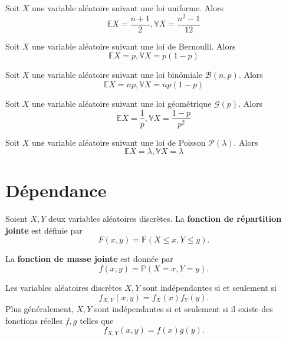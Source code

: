 \documentclass[]{book}
\theoremstyle{definition}
\theoremstyle{definition}
\theoremstyle{definition}
\theoremstyle{remark}
\let\BeginKnitrBlock\begin \let\EndKnitrBlock\end
\begin{document}
\BeginKnitrBlock{theorem}
\protect\hypertarget{thm:unnamed-chunk-18}{}{\label{thm:unnamed-chunk-18} }Soit \(X\) une variable aléatoire suivant une loi uniforme. Alors
\[\mathbb{E}X = \frac{n+1}{2} , \mathbb{V}X = \frac{n^2-1}{12}\]
\EndKnitrBlock{theorem}

\BeginKnitrBlock{theorem}
\protect\hypertarget{thm:unnamed-chunk-19}{}{\label{thm:unnamed-chunk-19} }Soit \(X\) une variable aléatoire suivant une loi de Bernoulli. Alors
\[\mathbb{E}X = p , \mathbb{V}X = p(1-p)\]
\EndKnitrBlock{theorem}

\BeginKnitrBlock{theorem}
\protect\hypertarget{thm:unnamed-chunk-20}{}{\label{thm:unnamed-chunk-20} }Soit \(X\) une variable aléatoire suivant une loi binômiale \(\mathcal{B}(n,p)\). Alors
\[\mathbb{E}X = np , \mathbb{V}X = np(1-p)\]
\EndKnitrBlock{theorem}

\BeginKnitrBlock{theorem}
\protect\hypertarget{thm:unnamed-chunk-21}{}{\label{thm:unnamed-chunk-21} }Soit \(X\) une variable aléatoire suivant une loi géométrique \(\mathcal{G}(p)\). Alors
\[\mathbb{E}X = \frac{1}{p} , \mathbb{V}X = \frac{1-p}{p^2}\]
\EndKnitrBlock{theorem}

\BeginKnitrBlock{theorem}
\protect\hypertarget{thm:unnamed-chunk-22}{}{\label{thm:unnamed-chunk-22} }Soit \(X\) une variable aléatoire suivant une loi de Poisson \(\mathcal{P}(\lambda)\). Alors
\[\mathbb{E}X = \lambda , \mathbb{V}X = \lambda\]
\EndKnitrBlock{theorem}

\hypertarget{duxe9pendance}{%
\section{Dépendance}\label{duxe9pendance}}

\BeginKnitrBlock{definition}
\protect\hypertarget{def:unnamed-chunk-23}{}{\label{def:unnamed-chunk-23} }Soient \(X,Y\) deux variables aléatoires discrètes. La \textbf{fonction de répartition jointe} est définie par
\[F(x,y) = \mathbb{P}(X \leq x , Y \leq y).\]

La \textbf{fonction de masse jointe} est donnée par
\[ f(x,y) = \mathbb{P}(X=x, Y=y).\]
\EndKnitrBlock{definition}

\BeginKnitrBlock{lemma}
\protect\hypertarget{lem:unnamed-chunk-24}{}{\label{lem:unnamed-chunk-24} }Les variables aléatoires discrètes \(X,Y\) sont indépendantes si et seulement si
\[
f_{X,Y}(x,y) = f_X(x) f_Y(y).  
\]
Plus généralement, \(X,Y\) sont indépendantes si et seulement si il existe des fonctions réelles \(f,g\) telles que
\[
  f_{X,Y}(x,y) = f(x) g(y).  
\]
\EndKnitrBlock{lemma}
\end{document}
